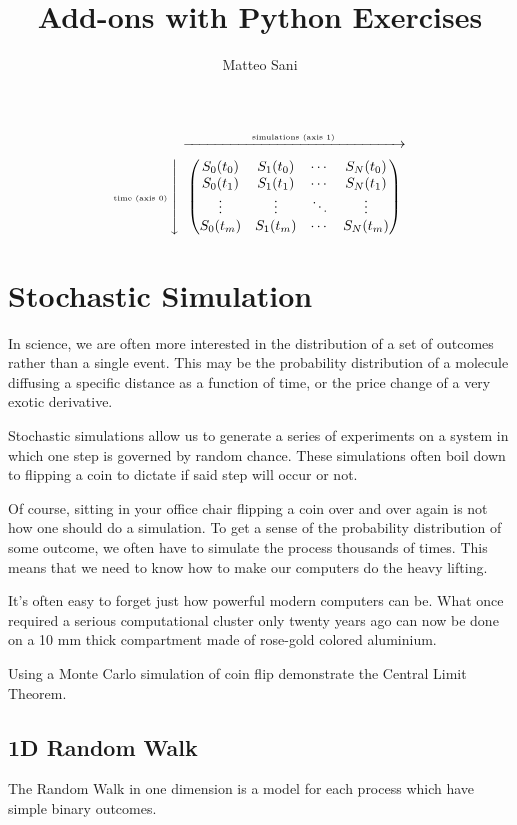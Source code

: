 \documentclass[12pt,a4paper]{article}
\title{Add-ons with Python Exercises}
\author{Matteo Sani}
\newcommand{\mymatrix}[1]{\ensuremath{\left\downarrow\vphantom{#1}\right.\overset{\xrightarrow[\hphantom{#1}]{\text{simulations (axis 1)}}}{#1}}}
\begin{document}
\maketitle

\begin{equation*}
\text{\tiny time (axis 0)}\mymatrix{\begin{pmatrix}
        S_0(t_0) & S_1(t_0) & \cdots & S_N(t_0) \\
        S_0(t_1) & S_1(t_1) & \cdots & S_N(t_1) \\
        \vdots  & \vdots  & \ddots & \vdots  \\
        S_0(t_m) & S_1(t_m) & \cdots & S_N(t_m)
        \end{pmatrix}}
\end{equation*}
\section{Stochastic Simulation}
In science, we are often more interested in the distribution of a set of outcomes rather than a single event. This may be the probability distribution of a molecule diffusing a specific distance as a function of time, or the price change of a very exotic derivative.

Stochastic simulations allow us to generate a series of experiments on a system in which one step is governed by random chance. These simulations often boil down to flipping a coin to dictate if said step will occur or not.

Of course, sitting in your office chair flipping a coin over and over again is not how one should do a simulation. To get a sense of the probability distribution of some outcome, we often have to simulate the process thousands of times. This means that we need to know how to make our computers do the heavy lifting.

It's often easy to forget just how powerful modern computers can be. What once required a serious computational cluster only twenty years ago can now be done on a 10 mm thick compartment made of rose-gold colored aluminium. 


\begin{question}
Using a Monte Carlo simulation of coin flip demonstrate the Central Limit Theorem.
\end{question}

\subsection{1D Random Walk}
The Random Walk in one dimension is a model for each process which have simple binary outcomes.
\end{document}
